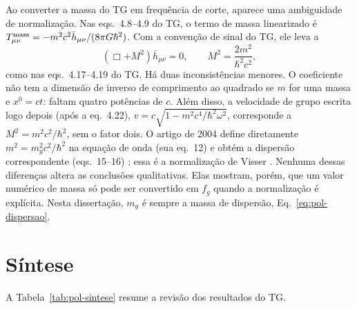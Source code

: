 Ao converter a massa do TG em frequência de corte, aparece uma
ambiguidade de normalização. Nas eqs.~4.8--4.9 do TG, o termo de massa
linearizado é
$T^{\rm mass}_{\mu\nu}=-m^2c^2\bar h_{\mu\nu}/(8\pi G\hbar^2)$. Com a
convenção de sinal do TG, ele leva a
\begin{equation}
 \left(\Box+M^2\right)\bar h_{\mu\nu}=0,\qquad
 M^2=\frac{2m^2}{\hbar^2c^2},
 \label{eq:pol-tg-massa}
\end{equation}
como nas eqs.~4.17--4.19 do TG. Há duas inconsistências menores. O
coeficiente não tem a dimensão de inverso de comprimento ao quadrado se
$m$ for uma massa e $x^0=ct$: faltam quatro potências de $c$. Além
disso, a velocidade de grupo escrita logo depois (após a eq.~4.22),
$v=c\sqrt{1-m^2c^4/\hbar^2\omega^2}$, corresponde a $M^2=m^2c^2/\hbar^2$,
sem o fator dois. O artigo de 2004 define diretamente
$m^2=m_g^2c^2/\hbar^2$ na equação de onda (sua eq.~12) e obtém a
dispersão correspondente (eqs.~15--16) \autocite{depaula2004}; essa é a
normalização de Visser \autocite{visser1998}. Nenhuma dessas diferenças
altera as conclusões qualitativas. Elas mostram, porém, que um valor
numérico de massa só pode ser convertido em $f_g$ quando a normalização
é explícita. Nesta dissertação, $m_g$ é sempre a massa de dispersão,
Eq.~\eqref{eq:pol-dispersao}.

\section{Síntese}

A Tabela~\ref{tab:pol-sintese} resume a revisão dos resultados do TG.

